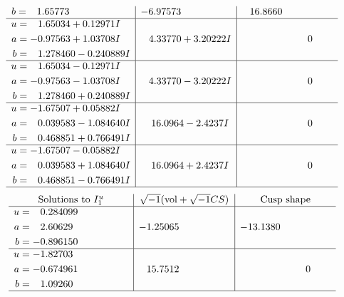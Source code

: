 \documentclass[1p]{elsarticle_modified}
\theoremstyle{definition}
\newcommand{\I}{\sqrt{-1}}
\begin{document}
$$\begin{array}{c|c|c}
\begin{aligned}
b &= \phantom{-}1.65773\phantom{ +0.000000I}\end{aligned}
 & -6.97573\phantom{ +0.000000I} & \phantom{-}16.8660\phantom{ +0.000000I} \\ \hline\begin{aligned}
u &= \phantom{-}1.65034 + 0.12971 I \\
a &= -0.97563 + 1.03708 I \\
b &= \phantom{-}1.278460 - 0.240889 I\end{aligned}
 & \phantom{-}4.33770 + 3.20222 I & \phantom{-0.000000 } 0 \\ \hline\begin{aligned}
u &= \phantom{-}1.65034 - 0.12971 I \\
a &= -0.97563 - 1.03708 I \\
b &= \phantom{-}1.278460 + 0.240889 I\end{aligned}
 & \phantom{-}4.33770 - 3.20222 I & \phantom{-0.000000 } 0 \\ \hline\begin{aligned}
u &= -1.67507 + 0.05882 I \\
a &= \phantom{-}0.039583 - 1.084640 I \\
b &= \phantom{-}0.468851 + 0.766491 I\end{aligned}
 & \phantom{-}16.0964 - 2.4237 I & \phantom{-0.000000 } 0 \\ \hline\begin{aligned}
u &= -1.67507 - 0.05882 I \\
a &= \phantom{-}0.039583 + 1.084640 I \\
b &= \phantom{-}0.468851 - 0.766491 I\end{aligned}
 & \phantom{-}16.0964 + 2.4237 I & \phantom{-0.000000 } 0\\
 \hline 
 \end{array}$$\newpage$$\begin{array}{c|c|c}  
\text{Solutions to }I^u_{1}& \I (\text{vol} + \sqrt{-1}CS) & \text{Cusp shape}\\
 \hline 
\begin{aligned}
u &= \phantom{-}0.284099\phantom{ +0.000000I} \\
a &= \phantom{-}2.60629\phantom{ +0.000000I} \\
b &= -0.896150\phantom{ +0.000000I}\end{aligned}
 & -1.25065\phantom{ +0.000000I} & -13.1380\phantom{ +0.000000I} \\ \hline\begin{aligned}
u &= -1.82703\phantom{ +0.000000I} \\
a &= -0.674961\phantom{ +0.000000I} \\
b &= \phantom{-}1.09260\phantom{ +0.000000I}\end{aligned}
 & \phantom{-}15.7512\phantom{ +0.000000I} & \phantom{-0.000000 } 0\\
 \hline 
 \end{array}$$\newpage\newpage\renewcommand{\arraystretch}{1}
\end{document}
